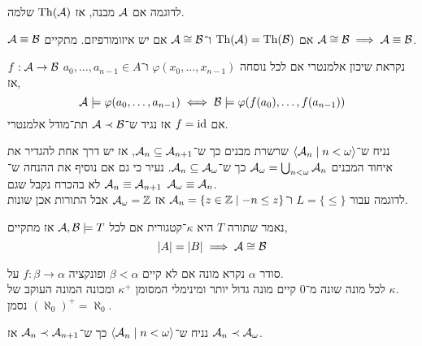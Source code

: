 לדוגמה אם $\mathcal{A}$ מבנה, אז $\operatorname{Th}(\mathcal{A})$ שלמה.
\begin{definition}[שקילות]
	$\mathcal{A} \equiv \mathcal{B}$ אם $\operatorname{Th}(\mathcal{A}) = \operatorname{Th}(\mathcal{B})$ ו־$\mathcal{A} \cong \mathcal{B}$ אם יש איזומורפיזם.
	מתקיים $\mathcal{A} \cong \mathcal{B} \implies \mathcal{A} \equiv \mathcal{B}$.
\end{definition}
\begin{definition}
	$f : \mathcal{A} \to \mathcal{B}$ נקראת שיכון אלמנטרי אם לכל נוסחה $\varphi(x_0, \ldots, x_{n - 1})$ ו־$a_0, \ldots, a_{n - 1} \in A$ אז,
	\[
		\mathcal{A} \models \varphi(a_0, \ldots, a_{n - 1})
		\iff \mathcal{B} \models \varphi(f(a_0), \ldots, f(a_{n - 1}))
	\]
	אם $f = \operatorname{id}$ אז נגיד ש־$\mathcal{A} \prec \mathcal{B}$ תת־מודל אלמנטרי.
\end{definition}
\begin{remark}
	נניח ש־$\langle \mathcal{A}_n \mid n < \omega \rangle$ שרשרת מבנים כך ש־$\mathcal{A}_n \subseteq \mathcal{A}_{n + 1}$,
	אז יש דרך אחת להגדיר את איחוד המבנים $\mathcal{A}_{\omega} = \bigcup_{n < \omega} \mathcal{A}_n$ כך ש־$\mathcal{A}_n \subseteq \mathcal{A}_{\omega}$.
	נעיר כי גם אם נוסיף את ההנחה ש־$\mathcal{A}_n \equiv \mathcal{A}_{n + 1}$ לא בהכרח נקבל שגם $\mathcal{A}_{\omega} \equiv \mathcal{A}_n$. \\
	לדוגמה עבור $L = \{ \le \}$ ו־$\mathcal{A}_n = \{ z \in \mathbb{Z} \mid -n \le z \}$ אז $\mathcal{A}_{\omega} = \mathbb{Z}$ אבל התורות אכן שונות.
\end{remark}
\begin{definition}[קטגוריות]
	נאמר שתורה $T$ היא $\kappa$־קטגורית אם לכל $\mathcal{A}, \mathcal{B} \models T$ אז מתקיים,
	\[
		|A| = |B|
		\implies \mathcal{A} \cong \mathcal{B}
	\]
\end{definition}
\begin{remark}
	סודר $\alpha$ נקרא מונה אם לא קיים $\beta < \alpha$ ופונקציה $f : \beta \to \alpha$ על. \\
	לכל מונה שונה מ־0 קיים מונה גדול יותר ומינימלי המסומן $\kappa^+$ ומכונה המונה העוקב של $\kappa$. \\
	נסמן ${(\aleph_0)}^+ = \aleph_0$.
\end{remark}
\begin{theorem}
	נניח ש־$\langle \mathcal{A}_n \mid n < \omega \rangle$ כך ש־$\mathcal{A}_n \prec \mathcal{A}_{n + 1}$ אז $\mathcal{A}_n \prec \mathcal{A}_{\omega}$.
\end{theorem}
